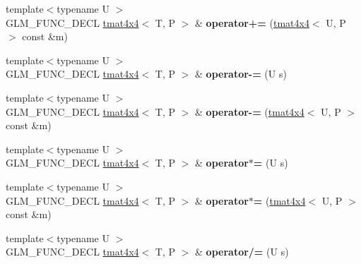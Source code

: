 \begin{DoxyCompactItemize}
\item 
{\footnotesize template$<$typename U $>$ }\\G\+L\+M\+\_\+\+F\+U\+N\+C\+\_\+\+D\+E\+CL \hyperlink{structglm_1_1detail_1_1tmat4x4}{tmat4x4}$<$ T, P $>$ \& {\bfseries operator+=} (\hyperlink{structglm_1_1detail_1_1tmat4x4}{tmat4x4}$<$ U, P $>$ const \&m)\hypertarget{structglm_1_1detail_1_1tmat4x4_a4b67c9c0f2f7eca42f6d41a5f91fcdf5}{}\label{structglm_1_1detail_1_1tmat4x4_a4b67c9c0f2f7eca42f6d41a5f91fcdf5}

\item 
{\footnotesize template$<$typename U $>$ }\\G\+L\+M\+\_\+\+F\+U\+N\+C\+\_\+\+D\+E\+CL \hyperlink{structglm_1_1detail_1_1tmat4x4}{tmat4x4}$<$ T, P $>$ \& {\bfseries operator-\/=} (U s)\hypertarget{structglm_1_1detail_1_1tmat4x4_acfc4f485eb7cd93ed168d924582e89ba}{}\label{structglm_1_1detail_1_1tmat4x4_acfc4f485eb7cd93ed168d924582e89ba}

\item 
{\footnotesize template$<$typename U $>$ }\\G\+L\+M\+\_\+\+F\+U\+N\+C\+\_\+\+D\+E\+CL \hyperlink{structglm_1_1detail_1_1tmat4x4}{tmat4x4}$<$ T, P $>$ \& {\bfseries operator-\/=} (\hyperlink{structglm_1_1detail_1_1tmat4x4}{tmat4x4}$<$ U, P $>$ const \&m)\hypertarget{structglm_1_1detail_1_1tmat4x4_a47a07eac46c9ed5021446e40bbfb8d8e}{}\label{structglm_1_1detail_1_1tmat4x4_a47a07eac46c9ed5021446e40bbfb8d8e}

\item 
{\footnotesize template$<$typename U $>$ }\\G\+L\+M\+\_\+\+F\+U\+N\+C\+\_\+\+D\+E\+CL \hyperlink{structglm_1_1detail_1_1tmat4x4}{tmat4x4}$<$ T, P $>$ \& {\bfseries operator$\ast$=} (U s)\hypertarget{structglm_1_1detail_1_1tmat4x4_a5f45264cb14dad1d45f52b8dc4c21182}{}\label{structglm_1_1detail_1_1tmat4x4_a5f45264cb14dad1d45f52b8dc4c21182}

\item 
{\footnotesize template$<$typename U $>$ }\\G\+L\+M\+\_\+\+F\+U\+N\+C\+\_\+\+D\+E\+CL \hyperlink{structglm_1_1detail_1_1tmat4x4}{tmat4x4}$<$ T, P $>$ \& {\bfseries operator$\ast$=} (\hyperlink{structglm_1_1detail_1_1tmat4x4}{tmat4x4}$<$ U, P $>$ const \&m)\hypertarget{structglm_1_1detail_1_1tmat4x4_a7f776dccae9e5f84df52c4118986f3f9}{}\label{structglm_1_1detail_1_1tmat4x4_a7f776dccae9e5f84df52c4118986f3f9}

\item 
{\footnotesize template$<$typename U $>$ }\\G\+L\+M\+\_\+\+F\+U\+N\+C\+\_\+\+D\+E\+CL \hyperlink{structglm_1_1detail_1_1tmat4x4}{tmat4x4}$<$ T, P $>$ \& {\bfseries operator/=} (U s)\hypertarget{structglm_1_1detail_1_1tmat4x4_a416de4c3606f70b3472286159d73454a}{}\label{structglm_1_1detail_1_1tmat4x4_a416de4c3606f70b3472286159d73454a}


\end{DoxyCompactItemize}
